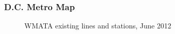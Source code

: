 \documentclass[compress,handout,10pt]{beamer}
\begin{document}
\begin{frame}
\frametitle{D.C. Metro Map}
\begin{figure}[h]
    \begin{center}
    \end{center}
    \caption{WMATA existing lines and stations, June 2012}
\end{figure}
\end{frame}
\end{document}
